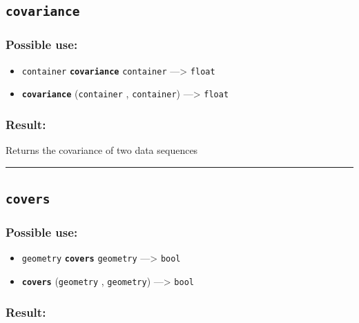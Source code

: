 \documentclass[]{book}
\providecommand{\tightlist}{%
  \setlength{\itemsep}{0pt}\setlength{\parskip}{0pt}}
\theoremstyle{definition}
\theoremstyle{definition}
\theoremstyle{definition}
\theoremstyle{remark}
\begin{document}
\subsection{\texorpdfstring{\texttt{covariance}}{covariance}}\label{covariance}

\subsubsection{Possible use:}\label{possible-use-113}

\begin{itemize}
\tightlist
\item
  \texttt{container} \textbf{\texttt{covariance}} \texttt{container}
  ---\textgreater{} \texttt{float}
\item
  \textbf{\texttt{covariance}} (\texttt{container} , \texttt{container})
  ---\textgreater{} \texttt{float}
\end{itemize}

\subsubsection{Result:}\label{result-110}

Returns the covariance of two data sequences

\begin{center}\rule{0.5\linewidth}{\linethickness}\end{center}

\subsection{\texorpdfstring{\texttt{covers}}{covers}}\label{covers}

\subsubsection{Possible use:}\label{possible-use-114}

\begin{itemize}
\tightlist
\item
  \texttt{geometry} \textbf{\texttt{covers}} \texttt{geometry}
  ---\textgreater{} \texttt{bool}
\item
  \textbf{\texttt{covers}} (\texttt{geometry} , \texttt{geometry})
  ---\textgreater{} \texttt{bool}
\end{itemize}

\subsubsection{Result:}\label{result-111}
\end{document}

